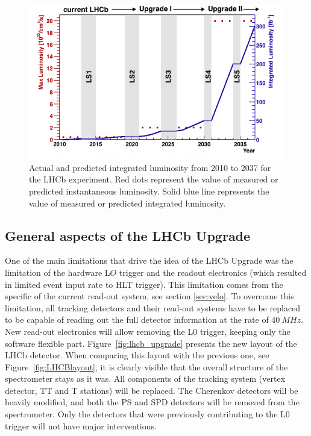 \begin{figure}[!h]
\centering
\includegraphics[width=\linewidth]{figures/lhcb_lumi.PNG}
\caption{Actual and predicted integrated luminosity from 2010 to 2037 for the LHCb experiment. Red dots represent
the value of measured or predicted instantaneous luminosity. Solid blue line represents the value of measured or predicted integrated luminosity.
\label{fig:lhcb_lumi}}
\end{figure}


\subsection{General aspects of the LHCb Upgrade}

One of the main limitations that drive the idea of the LHCb Upgrade was the limitation of the hardware L$O$ trigger and the readout electronics (which resulted in limited event input rate to HLT trigger). This limitation comes from the specific of the current read-out system, see section \ref{sec:velo}.  To overcome this limitation, all tracking detectors and their read-out systems have to be replaced to be capable of reading out the full detector information at the rate of $40 ~MHz$. New read-out electronics will allow removing the L0 trigger, keeping only the software flexible part. Figure~\ref{fig:lhcb_upgrade} presents the new layout of the LHCb detector. When comparing this layout with the previous one, see Figure~\ref{fig:LHCBlayout}, it is clearly visible that the overall structure of the spectrometer stays as it was. All components of the tracking system (vertex detector, TT and T stations) will be replaced. The Cherenkov detectors will be heavily modified, and both the PS and SPD detectors will be removed from the spectrometer. Only the detectors that were previously contributing to the L0 trigger will not have major interventions. 

